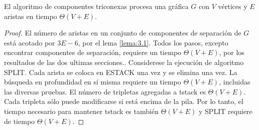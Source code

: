 \begin{lemma}
El algoritmo de componentes triconexas procesa una gráfica $G$ con $V$ vértices y $E$ aristas en tiempo $\Theta \left(V + E\right)$.
\label{lema:3.15}
\end{lemma}

\begin{proof}
El número de aristas en un conjunto de componentes de separación de $G$ está acotado por $3E - 6$, por el lema \ref{lema:3.1}. Todos los pasos, excepto encontrar componentes de separación, requiere un tiempo $\Theta\left(V+ E\right)$, por los resultados de las dos ultimas secciones.. Considerese la ejecución de algoritmo SPLIT. Cada arista se coloca en ESTACK una vez y se elimina una vez. La búsqueda en profundidad en sí misma requiere un tiempo $\Theta\left(V + E\right)$, incluidas las diversas pruebas. El número de tripletas agregadas a tstack es $\Theta\left(V + E\right)$. Cada tripleta sólo puede modificarse si está encima de la pila. Por lo tanto, el tiempo necesario para mantener tstack es también $\Theta\left(V + E\right)$ y SPLIT requiere de tiempo $\Theta\left(V + E\right)$.
\end{proof}
